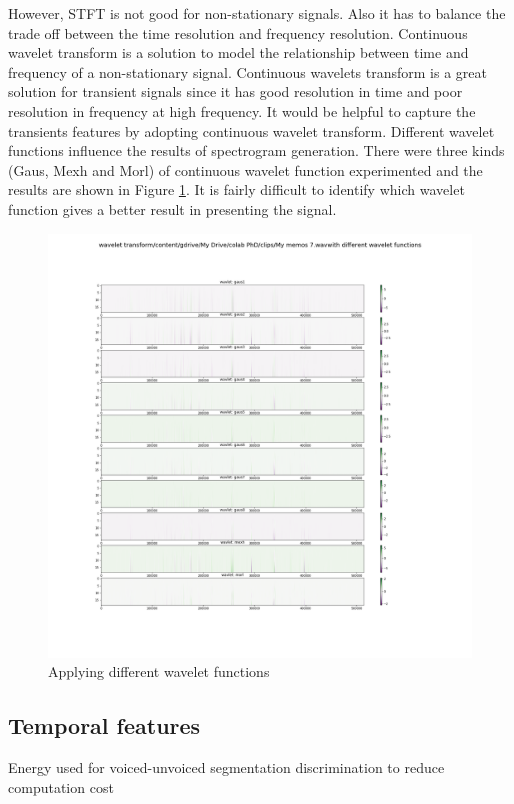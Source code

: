 However, STFT is not good for non-stationary signals. Also it has to balance the trade off between the time resolution and frequency resolution. Continuous wavelet transform is a solution to model the relationship between time and frequency of a non-stationary signal. Continuous wavelets transform is a great solution for transient signals since it has good resolution in time and poor resolution in frequency at high frequency. It would be helpful to capture the transients features by adopting continuous wavelet transform. Different wavelet functions influence the results of spectrogram generation. There were three kinds (Gaus, Mexh and Morl) of continuous wavelet function experimented and the results are shown in Figure \ref{fig:wavelet_functions}. It is fairly difficult to identify which wavelet function gives a better result in presenting the signal.
\begin{figure}[h]
    \centerline{\includegraphics[scale=0.25]{figures/wavelet_trans_wav_func.png}}
    \caption{Applying different wavelet functions}
    \label{fig:wavelet_functions}
\end{figure}

\subsection{Temporal features}
Energy used for voiced-unvoiced segmentation discrimination to reduce computation cost

